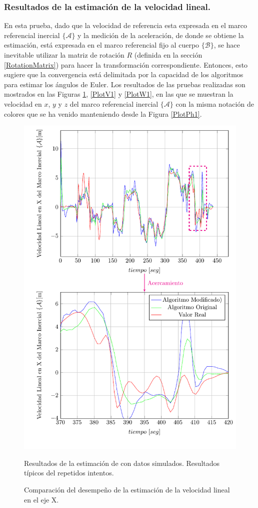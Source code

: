 \documentclass[10pt]{report}
\numberwithin{equation}{chapter}
\numberwithin{algorithm}{chapter}
\newcommand{\marco}[1]{\{\mathcal{#1}\}}
\begin{document}
\subsubsection{Resultados de la estimación de la velocidad lineal.}
En esta prueba, dado que la velocidad de referencia esta expresada en el marco referencial inercial $\marco{A}$ y la medición de la aceleración, de donde se obtiene la estimación, está expresada en el marco referencial fijo al cuerpo $\marco{B}$, se hace inevitable utilizar la matriz de rotación $R$ (definida en la sección \ref{RotationMatrix}) para hacer la transformación correspondiente. Entonces, esto sugiere que la convergencia está delimitada por la capacidad de los algoritmos para estimar los ángulos de Euler. Los resultados de las pruebas realizadas son mostrados en las Figuras \ref{PlotU1}, \ref{PlotV1} y \ref{PlotW1}, en las que se muestran la velocidad en $x$, $y$ y $z$ del marco referencial inercial $\marco{A}$ con la misma notación de colores que se ha venido manteniendo desde la Figura \ref{PlotPh1}.\par
\begin{figure}
\begin{center}
\includegraphics[scale=0.8]
{PlotU.pdf}
\caption{Comparación del desempeño de la estimación de la velocidad lineal en el eje X.}
\scriptsize{Resultados de la estimación de con datos simulados. Resultados típicos del repetidos intentos.}
\label{PlotU1}
\end{center}
\end{figure}
\end{document}
